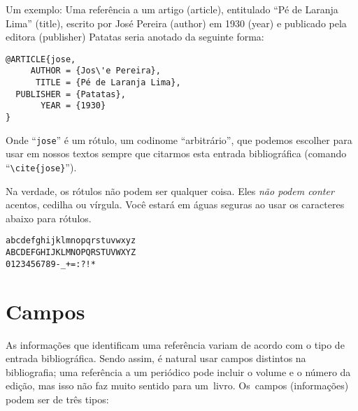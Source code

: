 \documentclass[article,openany]{memoir}
\begin{document}
Um exemplo: Uma referência a um artigo (article), entitulado ``Pé de
Laranja Lima'' (title), escrito por José Pereira (author) em 1930
(year) e publicado pela editora (publisher) Patatas seria anotado da
seguinte forma:

\begin{verbatim}
@ARTICLE{jose,
     AUTHOR = {Jos\'e Pereira},
      TITLE = {Pé de Laranja Lima},
  PUBLISHER = {Patatas},
       YEAR = {1930}
}
\end{verbatim}

Onde ``\verb/jose/'' é um rótulo, um codinome ``arbitrário'', que
podemos escolher para usar em nossos textos sempre que citarmos esta
entrada bibliográfica (comando ``\verb/\cite{jose}/'').

Na verdade, os rótulos não podem ser qualquer coisa. Eles \emph{não
podem conter} acentos, cedilha ou vírgula. Você estará em águas
seguras ao usar os caracteres abaixo para rótulos.

\begin{verbatim}
abcdefghijklmnopqrstuvwxyz
ABCDEFGHIJKLMNOPQRSTUVWXYZ
0123456789-_+=:?!*
\end{verbatim}

\chapter{Campos}

As informações que identificam uma referência variam de acordo com o
tipo de entrada bibliográfica. Sendo assim, é natural usar campos
distintos na bibliografia; uma referência a um periódico pode incluir
o volume e o número da edição, mas isso não faz muito sentido para
um~livro. Os~campos (informações) podem ser de três tipos:
\end{document}
